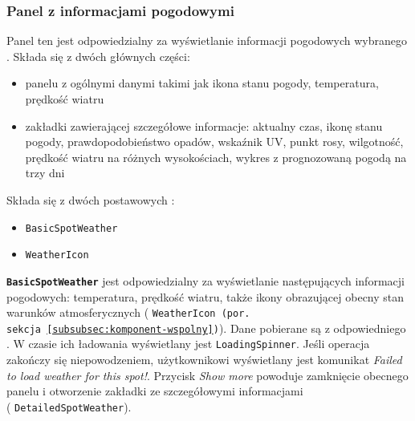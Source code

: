 
\subsubsection{Panel z informacjami pogodowymi}
\label{subsubsec:panel-z-informacjami-pogodowymi}

Panel ten jest odpowiedzialny za wyświetlanie informacji pogodowych wybranego .
Składa się z dwóch głównych części:
\begin{itemize}
    \item panelu z ogólnymi danymi takimi jak ikona stanu pogody, temperatura, prędkość wiatru
    \item zakładki zawierającej szczegółowe informacje: aktualny czas, ikonę stanu pogody, prawdopodobieństwo opadów,
    wskaźnik UV, punkt rosy, wilgotność, prędkość wiatru na różnych wysokościach, wykres z prognozowaną pogodą na trzy dni
\end{itemize}

\label{subsubsec:panel-z-danymi-ogolnymi}

Składa się z dwóch postawowych :
\begin{itemize}
    \item \texttt{BasicSpotWeather}
    \item \texttt{WeatherIcon}
\end{itemize}

\textbf{\texttt{BasicSpotWeather}}
 jest odpowiedzialny za wyświetlanie następujących informacji pogodowych: temperatura, prędkość wiatru,
także ikony obrazującej obecny stan warunków atmosferycznych ( \texttt{WeatherIcon (por. sekcja~\ref{subsubsec:komponent-wspolny})}).
Dane pobierane są z odpowiedniego  .
W czasie ich ładowania wyświetlany jest  \texttt{LoadingSpinner}.
Jeśli operacja zakończy się niepowodzeniem, użytkownikowi wyświetlany jest komunikat \emph{Failed to load weather for this spot!}.
Przycisk \emph{Show more} powoduje zamknięcie obecnego panelu i otworzenie zakładki ze szczegółowymi informacjami
\\ ( \texttt{DetailedSpotWeather}).

\label{subsubsec:panel-z-danymi-szczegolowymi}

